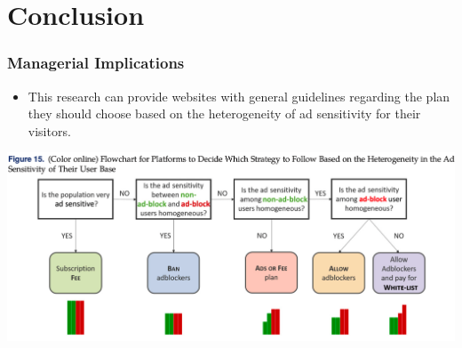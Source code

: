 \documentclass{beamer}
\begin{document}
\section{Conclusion}
\begin{frame}[label=current]
    \frametitle{Managerial Implications}
    \begin{itemize}
        \item This research can provide websites with general guidelines regarding the plan
            they should choose based on the heterogeneity of ad sensitivity for their visitors.
    \end{itemize}
    \includegraphics[width=\textwidth]{flow}
\end{frame}

\end{document}
